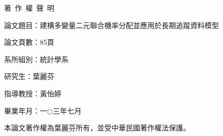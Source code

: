\nocite{*}               %
\ifodd{} \else \thispagestyle{plain}\mbox{}\clearpage \fi
{}   %


{}%
\ifodd{} \else \thispagestyle{empty}\mbox{}\clearpage\fi



\cleardoublepage
\thispagestyle{empty}
\begin{center}
    \huge 著~作~權~聲~明
\end{center}

\vspace*{1cm}
論文題目：建構多變量二元聯合機率分配並應用於長期追蹤資料模型

論文頁數：85頁

系所組別：統計學系

研究生：葉麗芬

指導教授：黃怡婷

畢業年月：一$\bigcirc$三年七月

本論文著作權為葉麗芬所有，並受中華民國著作權法保護。


